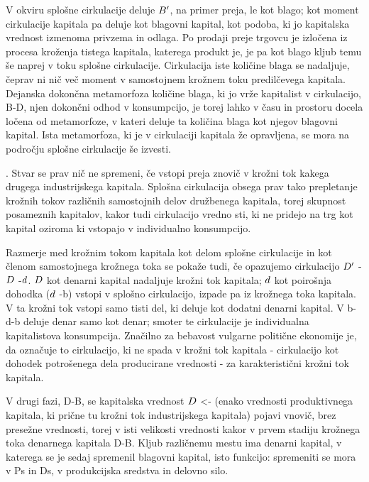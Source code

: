 \documentclass[kapital_02.tex]{subfiles}
\begin{document}
V okviru splošne cirkulacije deluje \( B' \), na primer preja, le kot blago; kot moment cirkulacije kapitala pa deluje kot blagovni kapital, kot podoba, ki jo kapitalska vrednost izmenoma privzema in odlaga. Po prodaji preje trgovcu je izločena iz procesa kroženja tistega kapitala, katerega produkt je, je pa kot blago kljub temu še naprej v toku splošne cirkulacije. Cirkulacija iste količine blaga se nadaljuje, čeprav ni nič več moment v samostojnem krožnem toku predilčevega kapitala. Dejanska dokončna metamorfoza količine blaga, ki jo vrže kapitalist v cirkulacijo, B-D, njen dokončni odhod v konsumpcijo, je torej lahko v času in prostoru docela ločena od metamorfoze, v kateri deluje ta količina blaga kot njegov blagovni kapital. Ista metamorfoza, ki je v cirkulaciji kapitala že opravljena, se mora na področju splošne cirkulacije še izvesti.

. Stvar se prav nič ne spremeni, če vstopi preja znovič v krožni tok kakega drugega industrijskega kapitala. Splošna cirkulacija obsega prav tako prepletanje krožnih tokov različnih samostojnih delov družbenega kapitala, torej skupnost posameznih kapitalov, kakor tudi cirkulacijo vredno sti, ki ne pridejo na trg kot kapital oziroma ki vstopajo v individualno konsumpcijo.

Razmerje med krožnim tokom kapitala kot delom splošne cirkulacije in kot členom samostojnega krožnega toka se pokaže tudi, če opazujemo cirkulacijo \( D' \) - \( D \) -\( d \). \( D \) kot denarni kapital nadaljuje krožni tok kapitala; \( d \) kot poirošnja dohodka (\( d \) -b) vstopi v splošno cirkulacijo, izpade pa iz krožnega toka kapitala. V ta krožni tok vstopi samo tisti del, ki deluje kot dodatni denarni kapital. V b-d-b deluje denar samo kot denar; smoter te cirkulacije je individualna kapitalistova konsumpcija. Značilno za bebavost vulgarne politične ekonomije je, da označuje to cirkulacijo, ki ne spada v krožni tok kapitala - cirkulacijo kot dohodek potrošenega dela producirane vrednosti - za karakteristični krožni tok kapitala.

V drugi fazi, D-B, se kapitalska vrednost \( D \) <- \KPEP (enako vrednosti produktivnega kapitala, ki prične tu krožni tok industrijskega kapitala) pojavi vnovič, brez presežne vrednosti, torej v isti velikosti vrednosti kakor v prvem stadiju krožnega toka denarnega kapitala D-B. Kljub različnemu mestu ima denarni kapital, v katerega se je sedaj spremenil blagovni kapital, isto funkcijo: spremeniti se mora v Ps in Ds, v produkcijska sredstva in delovno silo.
\end{document}
